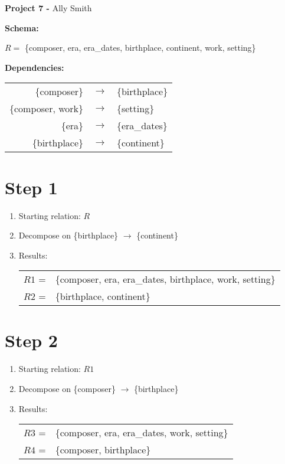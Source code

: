 \documentclass[11pt,letterpaper]{article}
\begin{document}
\begin{center}
    {\bf \large Project 7 -}
    Ally Smith
\end{center}

{\noindent \textbf{Schema:}}

\vspace{.1in}
$R =$ \{composer, era, era\_dates, birthplace, continent, work, setting\}
\vspace{.1in}


{\noindent \textbf{Dependencies:}}

\vspace{.1in}
\begin{tabular*}{4in}{r c l}
    \{composer\} &$\to$& \{birthplace\} \\
    \{composer, work\} &$\to$& \{setting\} \\
    \{era\} &$\to$& \{era\_dates\} \\
    \{birthplace\} &$\to$& \{continent\} \\
\end{tabular*}

\section*{Step 1}
\begin{enumerate}
    \item Starting relation: $R$
    \item Decompose on \{birthplace\} $\to$ \{continent\}
    \item Results:

    \begin{tabular*}{4in}{r l}
        $R1$ =& \{composer, era, era\_dates, birthplace, work, setting\} \\
        $R2$ =& \{birthplace, continent\} \\
    \end{tabular*}
\end{enumerate}

\section*{Step 2}
\begin{enumerate}
    \item Starting relation: $R1$
    \item Decompose on \{composer\} $\to$ \{birthplace\}
    \item Results:

    \begin{tabular*}{4in}{r l}
        $R3$ =& \{composer, era, era\_dates, work, setting\} \\
        $R4$ =& \{composer, birthplace\} \\
    \end{tabular*}
\end{enumerate}
\end{document}
